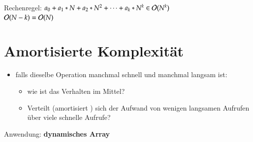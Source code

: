 Rechenregel: $a_0 + a_1 * N + a_2 * N^2 + \cdots + a_k * N^k \in \mathcal{O}{}(N^k)$ \\
    \hspace*{3cm} $\mathcal{O}{}(N-k) = \mathcal{O}{}(N)$


\section{Amortisierte Komplexität}
\begin{itemize}
    \item falls dieselbe Operation manchmal schnell und manchmal langsam ist:
    \begin{itemize}
        \item wie ist das Verhalten im Mittel?
        \item Verteilt (\glqq amortisiert \grqq) sich der Aufwand von wenigen langsamen Aufrufen über viele schnelle Aufrufe?
    \end{itemize}
\end{itemize}
Anwendung: \textbf{dynamisches Array}

